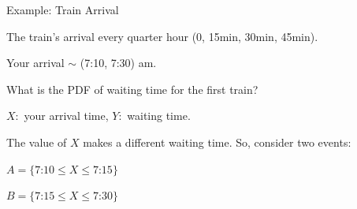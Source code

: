 \begin{frame}{Example: Train Arrival }

{

\bigskip




\plitemsep 0.1in
\bci
\item<1-> The train's arrival every quarter hour (0, 15min, 30min, 45min).

\item<1-> Your arrival $\sim$ (7:10, 7:30) am.

\item<2-> What is the PDF of waiting time for the first train?

\item<3-> $X:$ your arrival time, $Y:$ waiting time.

\item<4-> The value of $X$ makes a different waiting time. So, consider two events:

\medskip
$A = \{\text{7:10} \leq X \leq \text{7:15} \}$

\medskip
$B = \{\text{7:15} \leq X \leq \text{7:30} \}$

\eci
}
{
\small
\vspace{-0.3cm}
\vspace{-0.3cm}
}

\end{frame}

